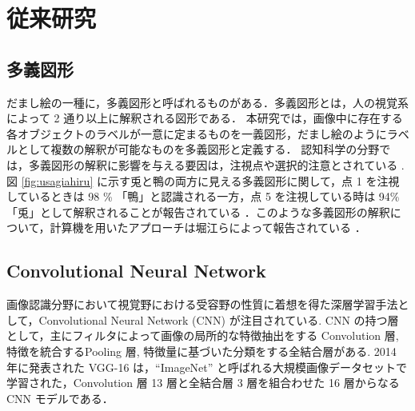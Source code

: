 \documentclass[twocolumn]{jarticle}     %
\newcommand{\1}{\mbox{1}\hspace{-0.25em}\mbox{l}}
\begin{document}

\section{従来研究}
\label{sec:pstudy}
\subsection{多義図形 \label{tagizukei}}
だまし絵の一種に，多義図形と呼ばれるものがある．多義図形とは，人の視覚系によって 2 通り以上に解釈される図形である．
本研究では，画像中に存在する各オブジェクトのラベルが一意に定まるものを一義図形，だまし絵のようにラベルとして複数の解釈が可能なものを多義図形と定義する．
認知科学の分野では，多義図形の解釈に影響を与える要因は，注視点や選択的注意とされている \cite{points}\cite{attention}.
% 
図 \ref{fig:usagiahiru} に示す兎と鴨の両方に見える多義図形に関して，点 1 を注視しているときは 98 \% 「鴨」と認識される一方，点 5 を注視している時は 94\% 「兎」として解釈されることが報告されている \cite{kawabata}．このような多義図形の解釈について，計算機を用いたアプローチは堀江らによって報告されている \cite{horie2020}．

\subsection{Convolutional Neural Network}

画像認識分野において視覚野における受容野の性質に着想を得た深層学習手法として，Convolutional Neural Network (CNN) \cite{shortcnn} が注目されている. 
CNN の持つ層として，主にフィルタによって画像の局所的な特徴抽出をする Convolution 層, 特徴を統合するPooling 層, 特徴量に基づいた分類をする全結合層がある. 2014 年に発表された VGG-16 は，``ImageNet'' と呼ばれる大規模画像データセットで学習された，Convolution 層 13 層と全結合層 3 層を組合わせた 16 層からなる CNN モデルである．
\end{document}
